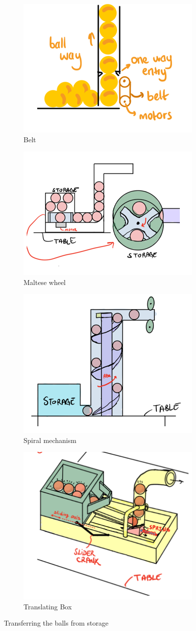 \documentclass[12pt]{report}
\begin{document}
\begin{appendices}
\begin{figure}[H]
\centering
\begin{subfigure}{.5\textwidth}
  \centering
  \includegraphics[width=.4\linewidth]{Function photos/Belt.png}
  \caption{Belt}
  \label{fig:belt}
\end{subfigure}%
\begin{subfigure}{.5\textwidth}
  \centering
  \includegraphics[width=.4\linewidth]{Function photos/maltese 1.png}
  \caption{Maltese wheel}
  \label{fig:maltese}
\end{subfigure}
\begin{subfigure}{.5\textwidth}
  \centering
  \includegraphics[width=.4\linewidth]{Function photos/spiral.png}
  \caption{Spiral mechanism}
  \label{fig:spiral}
\end{subfigure}%
\begin{subfigure}{.5\textwidth}
  \centering
  \includegraphics[width=.4\linewidth]{Function photos/Translating Box.png}
  \caption{Translating Box}
  \label{fig:translating_box}
\end{subfigure}%
\caption{Transferring the balls from storage }
\label{fig:transferring_storage}
\end{figure}


\end{appendices}
\end{document}
